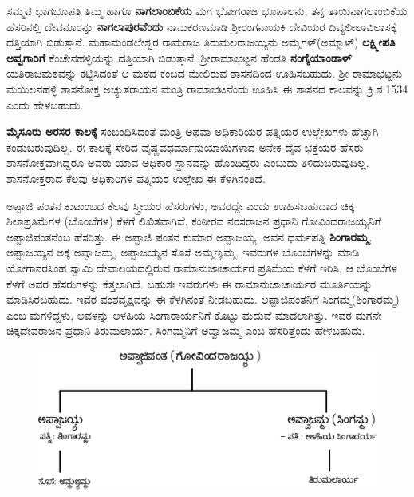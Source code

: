 ಸಮ್ಮಟಿ ಭಾಗಭೂಪತಿ ತಿಮ್ಮ ಹಾಗೂ \textbf{ನಾಗಲಾಂಬಿಕೆಯ} ಮಗ ಭೋಗರಾಜ ಭೂಪಾಲನು, ತನ್ನ ತಾಯಿ\break ನಾಗಲಾಂಬಿಕೆಯ ಹೆಸರಿನಲ್ಲಿ ದೇವನೂರನ್ನು \textbf{ನಾಗಲಾಪುರವೆಂದು} ನಾಮಕರಣಮಾಡಿ ಶ‍್ರೀರಂಗನಾಯಕಿ ದೇವಿಯರ ದಿವ್ಯಲೀಲಾವಿಲಾಸಕ್ಕೆ ದತ್ತಿಯಾಗಿ ಬಿಡುತ್ತಾನೆ. ಮಹಾಮಂಡಲೇಶ್ವರ ರಾಮರಾಜ ತಿರುಮಲರಾಜಯ್ಯನು ಅಮ್ಮಗಳ್​\break (ಅಮ್ಮಾಳ್​) \textbf{ಲಕ್ಷ್ಮೀಪತಿ ಅವ್ವಗಾರಿಗೆ} ಕೆಂಚೇನಹಳ್ಳಿಯನ್ನು ದತ್ತಿಯಾಗಿ ಬಿಡುತ್ತಾನೆ. ಶ‍್ರೀರಾಮಾಭಟ್ಟನ ಹೆಂಡತಿ \textbf{ನಂಗೈಯಾಂಡಾಳ್​} ಯತಿರಾಜಮಠವನ್ನು ಕಟ್ಟಿಸಿದಂತೆ ಆ ಮಠದ ಕಂಬದ ಮೇಲಿರುವ ಶಾಸನದಿಂದ ಊಹಿಸಬಹುದು. ಶ‍್ರೀ ರಾಮಾಭಟ್ಟನು ಮಯಿಲನಹಳ್ಳಿ ಶಾಸನೋಕ್ತ ಅಚ್ಯುತರಾಯನ ಮಂತ್ರಿ ರಾಮಾಭಟನೆಂದು ಊಹಿಸಿ ಈ ಶಾಸನದ ಕಾಲವನ್ನು ಕ್ರಿ.ಶ.1534 ಎಂದು ಹೇಳಬಹುದು.

\textbf{ಮೈಸೂರು ಅರಸರ ಕಾಲಕ್ಕೆ} ಸಂಬಂಧಿಸಿದಂತೆ ಮಂತ್ರಿ ಅಥವಾ ಅಧಿಕಾರಿಯರ ಪತ್ನಿಯರ ಉಲ್ಲೇಖಗಳು ಹೆಚ್ಚಾಗಿ ಕಂಡುಬರುವುದಿಲ್ಲ. ಈ ಕಾಲಕ್ಕೆ ಸೇರಿದ ವೈಷ್ಣವಧರ್ಮಾನುಯಾಯಿಗಳಾದ ಅನೇಕ ದೈವ ಭಕ್ತೆಯರ ಹೆಸರು ಶಾಸನೋಕ್ತ\-ವಾಗಿದ್ದರೂ ಅವರು ಯಾವ ಅಧಿಕಾರ ಸ್ಥಾನವನ್ನು ಹೊಂದಿದ್ದರು ಎಂಬುದು ತಿಳಿದುಬರುವುದಿಲ್ಲ. ಶಾಸನೋಕ್ತರಾದ ಕೆಲವು ಅಧಿಕಾರಿಗಳ ಪತ್ನಿಯರ ಉಲ್ಲೇಖ ಈ ಕೆಳಗಿನಂತಿದೆ.

ಅಪ್ಪಾಜಿ ಪಂತನ ಕುಟುಂಬದ ಕೆಲವು ಸ್ತ್ರೀಯರ ಹೆಸರುಗಳು, ಅವರದ್ದೇ ಎಂದು ಊಹಿಸಬಹುದಾದ ಚಿಕ್ಕ ಶಿಲಾಪ್ರತಿಮೆಗಳ (ಬೊಂಬೆಗಳ) ಕೆಳಗೆ ಲಿಖಿತವಾಗಿವೆ. ಕಂಠೀರವ ನರಸರಾಜನ ಪ್ರಧಾನಿ ಗೋವಿಂದರಾಜಯ್ಯನಿಗೆ ಅಪ್ಪಾಜಿಪಂತನೆಂಬ ಹೆಸರಿತ್ತು. ಈ ಅಪ್ಪಾಜಿ ಪಂತನ ಕುಮಾರ ಅಪ್ಪಾಜಯ್ಯ. ಅವನ ಧರ್ಮಪತ್ನಿ \textbf{ಶಿಂಗಾರಮ್ಮ}. ಅಪ್ಪಾಜಯ್ಯನ ಅಕ್ಕ ಅವ್ವಾಜಮ್ಮ, ಅಪ್ಪಾಜಯ್ಯನ ಸೊಸೆ ಅಮ್ಮಣ್ಯಮ್ಮ. ಇವರುಗಳ ಬೊಂಬೆಗಳನ್ನು ಮಾಡಿ ಯೋಗಾನರಸಿಂಹ ಸ್ವಾಮಿ ದೇವಾಲಯದಲ್ಲಿರುವ ರಾಮಾನುಜಾಚಾರ್ಯರ ಪ್ರತಿಮೆಯ ಕೆಳಗೆ ಇರಿಸಿ, ಆ ಬೊಂಬೆಗಳ ಕೆಳಗೆ ಅವರ ಹೆಸರುಗಳನ್ನು ಕೆತ್ತಲಾಗಿದೆ. ಬಹುಶಃ ಇವರುಗಳು ಈ ರಾಮಾನುಜಾಚಾರ್ಯರ ಮೂರ್ತಿಯನ್ನು ಮಾಡಿಸಿರಬಹುದು. ಇವರ ವಂಶವೃಕ್ಷವನ್ನು ಈ ಕೆಳಗಿನಂತೆ ನೀಡಬಹುದು. ಅಪ್ಪಾಜಿಪಂತನಿಗೆ ಸಿಂಗಮ್ಮ(ಶಿಂಗಾರಮ್ಮ) ಎಂಬ ಮಗಳಿದ್ದಳು, ಅವಳನ್ನು ಅಳಹಿಯ ಸಿಂಗಾರಾರ್ಯನಿಗೆ ಕೊಟ್ಟು ಮದುವೆ ಮಾಡಲಾಗಿತ್ತು. ಇವರ ಮಗನೇ ಚಿಕ್ಕದೇವರಾಜನ ಪ್ರಧಾನಿ ತಿರುಮಲಾರ್ಯ. ಸಿಂಗಮ್ಮನಿಗೆ ಅವ್ವಾಜಮ್ಮ ಎಂಬ ಹೆಸರಿತ್ತೆಂದು ಹೇಳಬಹುದು.

\begin{figure}[!h]
\includegraphics[scale=1.1]{images/chap5/chap5fig1.jpeg}
\end{figure}

